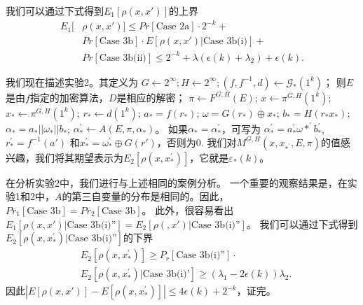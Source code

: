 \documentclass[]{article}
\begin{document}
    我们可以通过下式得到$E_1[\rho(x,x')]$的上界
    \begin{align*}
    	E_1[&\rho(x,x')]\leq Pr[\text{Case 2a}]\cdot 2^{-k}+\\
    	    &Pr[\text{Case 3b}]\cdot E[\rho(x,x')|\text{Case 3b(i)}]+\\
    	    &Pr[\text{Case 3b(ii)}]\leq 2^{-k}+\lambda(\epsilon(k)+\lambda_2)+\epsilon(k).
    \end{align*}
    
    
    我们现在描述实验2。其定义为
    $G\leftarrow 2^\infty;H\leftarrow 2^\infty;(f,f^{-1},d)\leftarrow \mathcal{G}_*(1^k)$；
    则$E$是由$f$指定的加密算法，$D$是相应的解密；
    $\pi \leftarrow F^{G,H}(E)$;
    $x\leftarrow \pi^{G,H}(1^k)$;
    $x_*\leftarrow \pi^{G,H}(1^k)$;
    $r_*\leftarrow d(1^k)$;
    $a_*=f(r_*)$;
    $\omega=G(r_*)\oplus x_*$;
    $b_*=H(r_*x_*)$;
    $\alpha_*=a_*||\omega_*||b_*$;
    $\alpha_{*}^{'}\leftarrow A(E,\pi,\alpha_*)$。
    如果$\alpha_*=\alpha_{*}^{'}$，可写为
    $\alpha_{*}^{'}=a_{*}^{'} \omega{*}^{'} b_{*}^{'}$,
    $r_{*}^{'}=f^{-1}(a')$
    和$x_{*}^{'}=\omega_{*}^{'} \oplus G(r')$，否则为0.
    我们对$M^{G,H}(x,x_{*^{'}},E,\pi)$的值感兴趣，我们将其期望表示为$E_2[\rho(x,x_{*}^{'})]$，它就是$\varepsilon_*(k)$。
    \par
    
    在分析实验2中，我们进行与上述相同的案例分析。
    一个重要的观察结果是，在实验1和2中，$A$的第三自变量的分布是相同的。因此，$Pr_1[\text{Case 3b}]=Pr_2[\text{Case 3b}]$。
    此外，很容易看出$E_1[\rho(x,x')|\text{Case 3b(i)''}]=E_2[\rho(,x')|\text{Case 3b(i)''}]$。
    我们可以通过下式得到$E_2[\rho(x,x_{*}^{'})|\text{Case 3b(i)''}]$的下界
    \begin{align*}
    	&E_2[\rho(x,x_{*}^{'})]\geq P_r[\text{Case 3b(i)''}]\cdot \\
    	&E_2[\rho(x,x_{*}^{'})| \text{Case 3b(i)'}]\geq (\lambda_1 -2\epsilon(k))\lambda_2.
    \end{align*}
    因此$|E[\rho(x,x')]-E[\rho(x,x_{*}^{'})]|\leq 4\epsilon(k)+2^{-k}$，证完。
 
\end{document}
